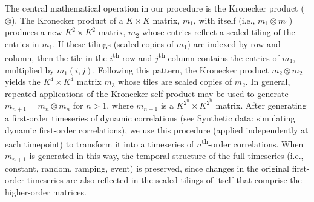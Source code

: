 \documentclass[english]{article}
\begin{document}
The central mathematical operation in our procedure is the Kronecker
product ($\otimes$).  The Kronecker product of a $K \times K$ matrix,
$m_1$, with itself (i.e., $m_1 \otimes m_1$) produces a new
$K^2 \times K^2$ matrix, $m_2$ whose entries reflect a scaled tiling
of the entries in $m_1$.  If these tilings (scaled copies of $m_1$) are
indexed by row and column, then the tile in the
$i$\textsuperscript{th} row and $j$\textsuperscript{th} column
contains the entries of $m_1$, multiplied by $m_1(i, j)$.  Following
this pattern, the Kronecker product $m_2 \otimes m_2$ yields the
$K^4 \times K^4$ matrix $m_3$ whose tiles are scaled copies of $m_2$.
In general, repeated applications of the Kronecker self-product may be
used to generate $m_{n+1} = m_n \otimes m_n$ for $n > 1$, where
$m_{n+1}$ is a $K^{2^n} \times K^{2^n}$ matrix.  After generating a
first-order timeseries of dynamic correlations (see Synthetic
  data: simulating dynamic first-order correlations), we use this
procedure (applied independently at each timepoint) to transform it
into a timeseries of $n$\textsuperscript{th}-order correlations.  When
$m_{n+1}$ is generated in this way, the temporal structure of the full
timeseries (i.e., constant, random, ramping, event) is preserved,
since changes in the original first-order timeseries are also
reflected in the scaled tilings of itself that comprise the
higher-order matrices.
\end{document}
